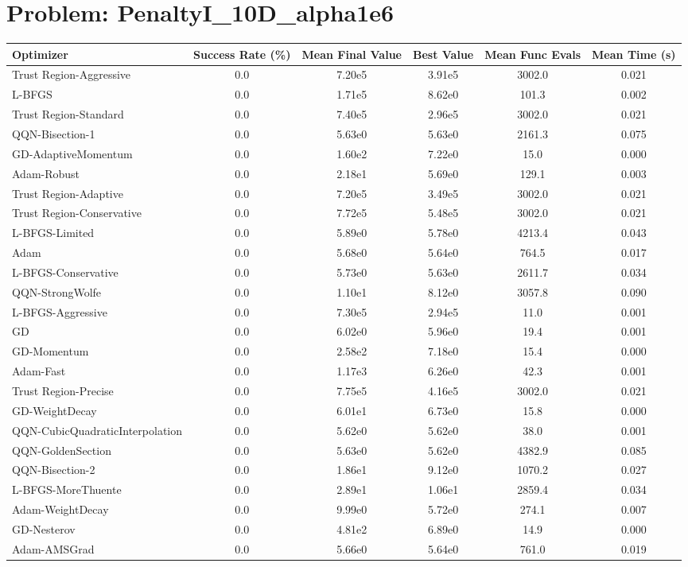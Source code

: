 \documentclass{article}
\begin{document}
\section{Problem: PenaltyI\_10D\_alpha1e6}
\begin{longtable}{p{3cm}*{5}{c}}
\toprule
\textbf{Optimizer} & \textbf{Success Rate (\%)} & \textbf{Mean Final Value} & \textbf{Best Value} & \textbf{Mean Func Evals} & \textbf{Mean Time (s)} \\
\midrule
Trust Region-Aggressive & 0.0 & 7.20e5 & 3.91e5 & 3002.0 & 0.021 \\
L-BFGS & 0.0 & 1.71e5 & 8.62e0 & 101.3 & 0.002 \\
Trust Region-Standard & 0.0 & 7.40e5 & 2.96e5 & 3002.0 & 0.021 \\
QQN-Bisection-1 & 0.0 & 5.63e0 & 5.63e0 & 2161.3 & 0.075 \\
GD-AdaptiveMomentum & 0.0 & 1.60e2 & 7.22e0 & 15.0 & 0.000 \\
Adam-Robust & 0.0 & 2.18e1 & 5.69e0 & 129.1 & 0.003 \\
Trust Region-Adaptive & 0.0 & 7.20e5 & 3.49e5 & 3002.0 & 0.021 \\
Trust Region-Conservative & 0.0 & 7.72e5 & 5.48e5 & 3002.0 & 0.021 \\
L-BFGS-Limited & 0.0 & 5.89e0 & 5.78e0 & 4213.4 & 0.043 \\
Adam & 0.0 & 5.68e0 & 5.64e0 & 764.5 & 0.017 \\
L-BFGS-Conservative & 0.0 & 5.73e0 & 5.63e0 & 2611.7 & 0.034 \\
QQN-StrongWolfe & 0.0 & 1.10e1 & 8.12e0 & 3057.8 & 0.090 \\
L-BFGS-Aggressive & 0.0 & 7.30e5 & 2.94e5 & 11.0 & 0.001 \\
GD & 0.0 & 6.02e0 & 5.96e0 & 19.4 & 0.001 \\
GD-Momentum & 0.0 & 2.58e2 & 7.18e0 & 15.4 & 0.000 \\
Adam-Fast & 0.0 & 1.17e3 & 6.26e0 & 42.3 & 0.001 \\
Trust Region-Precise & 0.0 & 7.75e5 & 4.16e5 & 3002.0 & 0.021 \\
GD-WeightDecay & 0.0 & 6.01e1 & 6.73e0 & 15.8 & 0.000 \\
QQN-CubicQuadraticInterpolation & 0.0 & 5.62e0 & 5.62e0 & 38.0 & 0.001 \\
QQN-GoldenSection & 0.0 & 5.63e0 & 5.62e0 & 4382.9 & 0.085 \\
QQN-Bisection-2 & 0.0 & 1.86e1 & 9.12e0 & 1070.2 & 0.027 \\
L-BFGS-MoreThuente & 0.0 & 2.89e1 & 1.06e1 & 2859.4 & 0.034 \\
Adam-WeightDecay & 0.0 & 9.99e0 & 5.72e0 & 274.1 & 0.007 \\
GD-Nesterov & 0.0 & 4.81e2 & 6.89e0 & 14.9 & 0.000 \\
Adam-AMSGrad & 0.0 & 5.66e0 & 5.64e0 & 761.0 & 0.019 \\
\bottomrule
\end{longtable}
\end{document}
